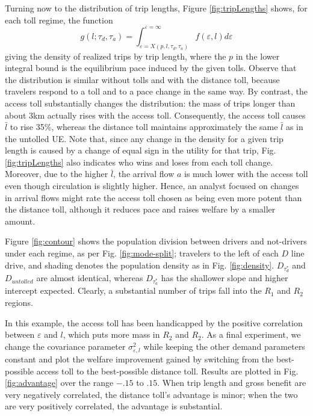 \documentclass[preprint,authoryear]{elsarticle}
\newcommand{\taud}{\tau_d}
\newcommand{\taua}{\tau_a}
\newcommand{\ve}{\varepsilon}
\begin{document}
Turning now to the distribution of trip lengths, Figure \ref{fig:tripLengths} shows, for each toll regime, the function
\begin{equation}
	g(l;\taud,\taua) = \int_{\ve=X(p,l,\taud,\taua)}^{\ve=\infty}f(\ve,l)d\ve
\end{equation}
giving the density of realized trips by trip length, where the $p$ in the lower integral bound is the equilibrium pace induced by the given tolls. Observe that the distribution is similar without tolls and with the distance toll, because travelers respond to a toll and to a pace change in the same way. By contrast, the access toll substantially changes the distribution: the mass of trips longer than about 3km actually rises with the access toll. Consequently, the access toll causes $\bar{l}$ to rise 35\%, whereas the distance toll maintains approximately the same $\bar{l}$ as in the untolled UE. Note that, since any change in the density for a given trip length is caused by a change of equal sign in the utility for that trip, Fig. \ref{fig:tripLengths} also indicates who wins and loses from each toll change. Moreover, due to the higher $\bar{l}$, the arrival flow $a$ is much lower with the access toll even though circulation is slightly higher. Hence, an analyst focused on changes in arrival flows might rate the access toll chosen as being even more potent than the distance toll, although it reduces pace and raises welfare by a smaller amount.

Figure \ref{fig:contour} shows the population division between drivers and not-drivers under each regime, as per Fig. \ref{fig:mode-split}; travelers to the left of each $D$ line drive, and shading denotes the population density as in Fig. \ref{fig:density}. $D_{\taud^*}$ and $D_{untolled}$ are almost identical, whereas $D_{\taua^*}$ has the shallower slope and higher intercept expected. Clearly, a substantial number of trips fall into the $R_1$ and $R_2$ regions.

In this example, the access toll has been handicapped by the positive correlation between $\ve$ and $l$, which puts more mass in $R_2$ and $R_2$. As a final experiment, we change the covariance parameter $\sigma_{\ve,l}^2$ while keeping the other demand parameters constant and plot the welfare improvement gained by switching from the best-possible access toll to the best-possible distance toll. Results are plotted in Fig. \ref{fig:advantage} over the range $-.15$ to $.15$. When trip length and gross benefit are very negatively correlated, the distance toll's advantage is minor; when the two are very positively correlated, the advantage is substantial.
\end{document}
